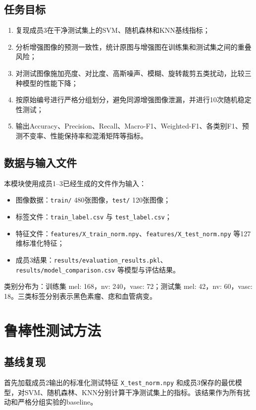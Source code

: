 \documentclass[12pt,a4paper]{ctexart}
\begin{document}
\subsection{任务目标}
\begin{enumerate}[label=(\arabic*)]
    \item 复现成员3在干净测试集上的SVM、随机森林和KNN基线指标；
    \item 分析增强图像的预测一致性，统计原图与增强图在训练集和测试集之间的重叠风险；
    \item 对测试图像施加亮度、对比度、高斯噪声、模糊、旋转裁剪五类扰动，比较三种模型的性能下降；
    \item 按原始编号进行严格分组划分，避免同源增强图像泄漏，并进行10次随机稳定性测试；
    \item 输出Accuracy、Precision、Recall、Macro-F1、Weighted-F1、各类别F1、预测不变率、性能保持率和混淆矩阵等指标。
\end{enumerate}

\subsection{数据与输入文件}
本模块使用成员1--3已经生成的文件作为输入：
\begin{itemize}
    \item 图像数据：\texttt{train/} 480张图像，\texttt{test/} 120张图像；
    \item 标签文件：\texttt{train\_label.csv} 与 \texttt{test\_label.csv}；
    \item 特征文件：\texttt{features/X\_train\_norm.npy}、\texttt{features/X\_test\_norm.npy} 等127维标准化特征；
    \item 成员3结果：\texttt{results/evaluation\_results.pkl}、\texttt{results/model\_comparison.csv} 等模型与评估结果。
\end{itemize}

类别分布为：训练集 mel: 168，nv: 240，vasc: 72；测试集 mel: 42，nv: 60，vasc: 18。三类标签分别表示黑色素瘤、痣和血管病变。

\section{鲁棒性测试方法}

\subsection{基线复现}
首先加载成员2输出的标准化测试特征 \texttt{X\_test\_norm.npy} 和成员3保存的最优模型，对SVM、随机森林、KNN分别计算干净测试集上的指标。该结果作为所有扰动和严格分组实验的baseline。
\end{document}
